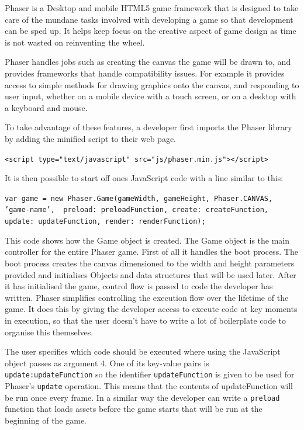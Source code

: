 \documentclass[12pt,a4paper,twoside,openright]{report}
\begin{document}
Phaser is a Desktop and mobile HTML5 game framework that is designed to take care of the mundane tasks involved with developing a game so that development can be sped up. It helps keep focus on the creative aspect of game design as time is not wasted on reinventing the wheel.

Phaser handles jobs such as creating the canvas the game will be drawn to, and provides frameworks that handle compatibility issues. For example it provides access to simple methods for drawing graphics onto the canvas, and responding to user input, whether on a mobile device with a touch screen, or on a desktop with a keyboard and mouse.

To take advantage of these features, a developer first imports the Phaser library by adding the minified script to their web page. %


\begin{displayquote}
	\texttt{<script type="text/javascript" src="js/phaser.min.js"></script>}
\end{displayquote}

It is then possible to start off ones JavaScript code with a line similar to this:

\begin{displayquote}
	\texttt{var game = new Phaser.Game(gameWidth, gameHeight, Phaser.CANVAS, 'game-name', { preload: preloadFunction, create: createFunction, update: updateFunction, render: renderFunction});}
\end{displayquote}

This code shows how the Game object is created.
The Game object is the main controller for the entire Phaser game. 
First of all it handles the boot process. The boot process creates the canvas dimensioned to the width and height parameters provided and initialises Objects and data structures that will be used later.
After it has initialised the game, control flow is passed to code the developer has written. 
Phaser simplifies controlling the execution flow over the lifetime of the game.
It does this by giving the developer access to execute code at key moments in execution, so that the user doesn't have to write a lot of boilerplate code to organise this themselves.

The user specifies which code should be executed where using the JavaScript object passes as argument 4.
One of its key-value pairs is \texttt{update:updateFunction} so the identifier \texttt{updateFunction} is given to be used for Phaser's \texttt{update} operation. This means that the contents of updateFunction will be run once every frame.
In a similar way the developer can write a \texttt{preload} function that loads assets before the game starts that will be run at the beginning of the game.
\end{document}
